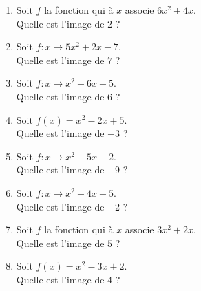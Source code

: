\begin{multicols}{2}
\begin{enumerate}[itemsep=1.5em]
	\item \begin{minipage}[t]{\linewidth} Soit $f$ la fonction qui
            à $x$ associe $6x^2+4x$. \\ Quelle est l'image de $2$ ?\\
            \dtf \end{minipage}
	\item \begin{minipage}[t]{\linewidth} Soit $f: x \longmapsto 5x^2+2x-7$. \\ Quelle est l'image de $7$ ?\\ \dtf \end{minipage}
	\item \begin{minipage}[t]{\linewidth} Soit $f: x \longmapsto x^2+6x+5$. \\ Quelle est l'image de $6$ ?\\ \dtf \end{minipage}
	\item \begin{minipage}[t]{\linewidth} Soit $f(x)=x^2-2x+5$. \\ Quelle est l'image de $-3$ ?\\ \dtf \end{minipage}
	\item \begin{minipage}[t]{\linewidth} Soit $f: x \longmapsto x^2+5x+2$. \\ Quelle est l'image de $-9$ ?\\ \dtf \end{minipage}
	\item \begin{minipage}[t]{\linewidth} Soit $f: x \longmapsto x^2+4x+5$. \\ Quelle est l'image de $-2$ ?\\ \dtf \end{minipage}
	\item \begin{minipage}[t]{\linewidth} Soit $f$ la fonction qui à $x$ associe $3x^2+2x$. \\ Quelle est l'image de $5$ ?\\ \dtf \end{minipage}
	\item \begin{minipage}[t]{\linewidth} Soit $f(x)=x^2-3x+2$. \\ Quelle est l'image de $4$ ?\\ \dtf \end{minipage}

\end{enumerate}
\end{multicols}
